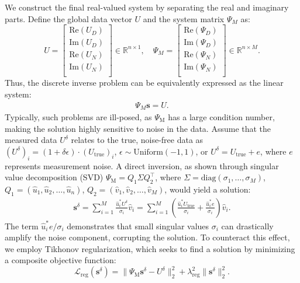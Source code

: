 \documentclass{article}
\theoremstyle{plain}
\theoremstyle{definition}
\begin{document}
We construct the final real-valued system by separating the real and imaginary parts. Define the global data vector $U$ and the system matrix $\Psi_M$ as:
\[
U = \begin{bmatrix}
\text{Re}(U_D)\\
\text{Im}(U_D)\\
\text{Re}(U_N)\\
\text{Im}(U_N)\\
\end{bmatrix}\in \mathbb{R}^{n\times 1}, \quad
\Psi_M= \begin{bmatrix}
\text{Re}(\Psi_D)\\
\text{Im}(\Psi_D)\\
\text{Re}(\Psi_N)\\
\text{Im}(\Psi_N)\\
\end{bmatrix} \in \mathbb{R}^{n\times M}.
\]
Thus, the discrete inverse problem can be equivalently expressed as the linear system:
\begin{align}\label{Ax=b}
    \Psi_M \boldsymbol{s} = U.
\end{align}
Typically,  such problems are ill-posed, as $\Psi_\text{M}$ has a large condition number,  making the solution highly sensitive to noise in the data. Assume that the measured data $U^{\delta}$ relates to the true,  noise-free data as 
$(U^{\delta})_i=(1+\delta \epsilon)\cdot(U_{\text{true}})_i$, $\epsilon\sim \text{Uniform}(-1,1)$, or $U^{\delta} = U_{\text{true}} + e$,  where $e$ represents measurement noise. A direct inversion, as shown through singular value decomposition (SVD) $\Psi_\text{M} = Q_1\Sigma Q_2^\top$, where $\Sigma = \text{diag}(\sigma_1, \ldots, \sigma_M)$, 
$Q_1=(\hat{u}_1, \hat{u}_2, \ldots, \hat{u}_n)$, $Q_2=(\hat{v}_1, \hat{v}_2, \ldots, \hat{v}_M)$,
would yield a solution: 
\begin{align*}
   \boldsymbol{s}^{\delta}=\sum_{i=1}^M\frac{\hat{u}_i^* U^{\delta}}{\sigma_i}\hat{v}_i=\sum_{i=1}^M\left(\frac{\hat{u}_i^* U_{\text{true}}}{\sigma_i}+\frac{\hat{u}_i^* e}{\sigma_i}\right)\hat{v}_i. 
\end{align*}
The term $\hat{u}_i^* e / \sigma_i$ demonstrates that small singular values $\sigma_i$ can drastically amplify the noise component, corrupting the solution. To counteract this effect,  we employ Tikhonov regularization,  which seeks to find a solution by minimizing a composite objective function: 
\begin{equation}\label{eq:T-reg-loss}
  \mathcal{L}_{\text{reg}}(\boldsymbol{s}^{\delta})= \|\Psi_\text{M} \boldsymbol{s}^{\delta} - U^{\delta}\|_2^2 + \lambda_{\text{reg}}^2 \|\boldsymbol{s}^{\delta}\|_2^2.  
\end{equation}
\end{document}
